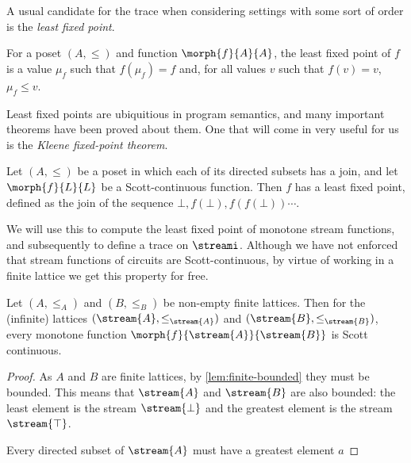 A usual candidate for the trace when considering settings with some sort of
order is the \emph{least fixed point}.

\begin{definition}
    For a poset \((A, \leq)\) and function \(\morph{f}{A}{A}\), the least
    fixed point of \(f\) is a value \(\mu_f\) such that \(f(\mu_f) = f\) and,
    for all values \(v\) such that \(f(v) = v\), \(\mu_f \leq v\).
\end{definition}

Least fixed points are ubiquitious in program semantics, and many important
theorems have been proved about them.
One that will come in very useful for us is the
\emph{Kleene fixed-point theorem}.



\begin{theorem}
    Let \((A, \leq)\) be a poset in which each of its directed subsets has a
    join, and let \(\morph{f}{L}{L}\) be a Scott-continuous function.
    Then \(f\) has a least fixed point, defined as the join of the sequence
    \(\bot, f(\bot), f(f(\bot)) \cdots\).
\end{theorem}

We will use this to compute the least fixed point of monotone stream functions,
and subsequently to define a trace on \(\streami\).
Although we have not enforced that stream functions of circuits are
Scott-continuous, by virtue of working in a finite lattice we get this property
for free.

\begin{lemma}\label{lem:finite-monotone-scott}
    Let \((A, \leq_A)\) and \((B, \leq_B)\) be non-empty finite lattices.
    Then for the (infinite) lattices
    \((\stream{A}, \leq_{\stream{A}})\) and
    \((\stream{B}, \leq_{\stream{B}})\), every monotone function
    \(\morph{f}{\stream{A}}{\stream{B}}\) is Scott continuous.
\end{lemma}
\begin{proof}
    As \(A\) and \(B\) are finite lattices, by \cref{lem:finite-bounded} they
    must be bounded.
    This means that \(\stream{A}\) and \(\stream{B}\) are also bounded: the
    least element is the stream \(\stream{\bot}\) and the greatest element is
    the stream \(\stream{\top}\).

    Every directed subset of \(\stream{A}\) must have a greatest element \(a\)


\end{proof}

